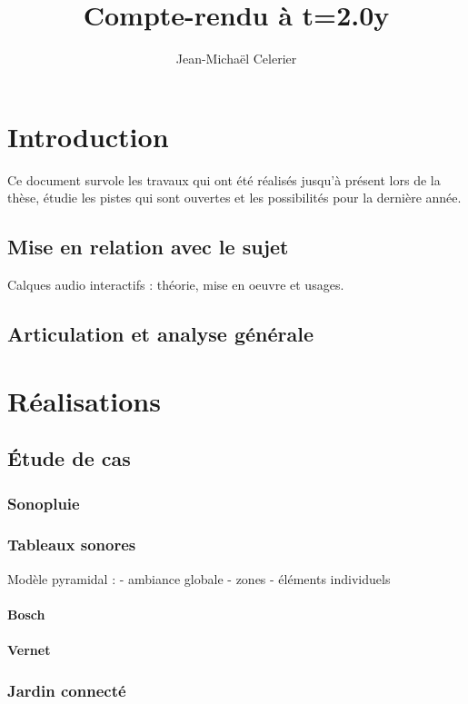 \documentclass[french,a4paper]{book}
\title{Compte-rendu à t=2.0y}
\author{Jean-Michaël Celerier}
\begin{document}
\maketitle

\tableofcontents

\chapter{Introduction}
Ce document survole les travaux qui ont été réalisés jusqu'à présent 
lors de la thèse, étudie les pistes qui sont ouvertes et les possibilités 
pour la dernière année.

\section{Mise en relation avec le sujet}
Calques audio interactifs : théorie, mise en oeuvre et usages.

\section{Articulation et analyse générale}
\chapter{Réalisations}

\section{Étude de cas}
\subsection{Sonopluie}
\subsection{Tableaux sonores}
Modèle pyramidal : 
- ambiance globale
- zones
- éléments individuels

\subsubsection{Bosch}
\subsubsection{Vernet}
\subsection{Jardin connecté}
\end{document}
